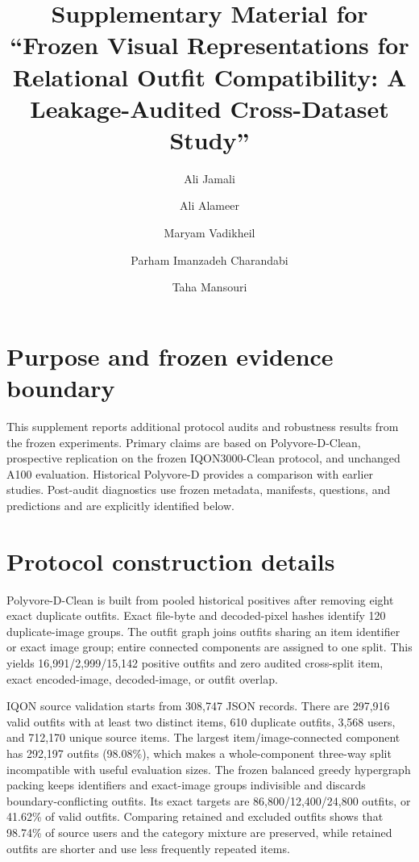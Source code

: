 \documentclass[preprint,12pt]{elsarticle}
\begin{document}
\begin{frontmatter}

\title{Supplementary Material for ``Frozen Visual Representations for Relational Outfit Compatibility: A Leakage-Audited Cross-Dataset Study''}
\author[salford]{Ali Jamali}
\author[salford]{Ali Alameer}
\author[salford]{Maryam Vadikheil}
\author[salford]{Parham Imanzadeh Charandabi}
\author[salford]{Taha Mansouri}

\end{frontmatter}

\renewcommand{\thesection}{S\arabic{section}}
\renewcommand{\thetable}{S\arabic{table}}
\renewcommand{\thefigure}{S\arabic{figure}}

\section{Purpose and frozen evidence boundary}

This supplement reports additional protocol audits and robustness results from the frozen experiments. Primary claims are based on Polyvore-D-Clean, prospective replication on the frozen IQON3000-Clean protocol, and unchanged A100 evaluation. Historical Polyvore-D provides a comparison with earlier studies. Post-audit diagnostics use frozen metadata, manifests, questions, and predictions and are explicitly identified below.

\section{Protocol construction details}

Polyvore-D-Clean is built from pooled historical positives after removing eight exact duplicate outfits. Exact file-byte and decoded-pixel hashes identify 120 duplicate-image groups. The outfit graph joins outfits sharing an item identifier or exact image group; entire connected components are assigned to one split. This yields 16,991/2,999/15,142 positive outfits and zero audited cross-split item, exact encoded-image, decoded-image, or outfit overlap.

IQON source validation starts from 308,747 JSON records. There are 297,916 valid outfits with at least two distinct items, 610 duplicate outfits, 3,568 users, and 712,170 unique source items. The largest item/image-connected component has 292,197 outfits (98.08\%), which makes a whole-component three-way split incompatible with useful evaluation sizes. The frozen balanced greedy hypergraph packing keeps identifiers and exact-image groups indivisible and discards boundary-conflicting outfits. Its exact targets are 86,800/12,400/24,800 outfits, or 41.62\% of valid outfits. Comparing retained and excluded outfits shows that 98.74\% of source users and the category mixture are preserved, while retained outfits are shorter and use less frequently repeated items.
\end{document}
